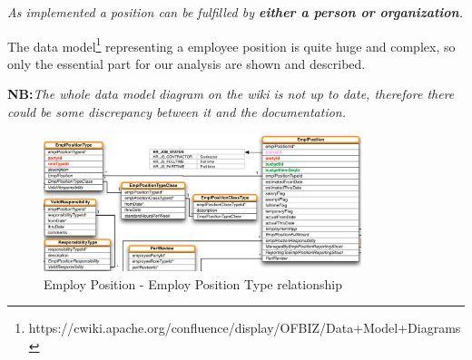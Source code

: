\textit{As implemented a position can be fulfilled by \textbf{either a person or organization}.}

The data model\footnote{https://cwiki.apache.org/confluence/display/OFBIZ/Data+Model+Diagrams} representing a employee position is quite huge and complex, so only the essential part for our analysis are shown and described.

\textbf{NB:}\textit{The whole data model diagram on the wiki is not up to date, therefore there could be some discrepancy between it and the documentation.}

\begin{figure}[H]
	\centerline{
		\includegraphics[width=350px]{../Datas/images/emplPos-posType.pdf}
	}
	\label{fig:emplPos-type}
	\caption{Employ Position - Employ Position Type relationship}
\end{figure}

